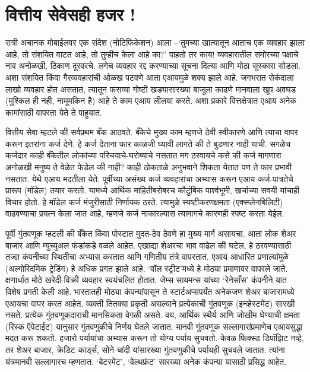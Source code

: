 \chapter{वित्तीय सेवेसही हजर !}

रात्री अचानक मोबाईलवर एक संदेश (नोटिफिकेशन) आला –`तुमच्या खात्यातून आताच एक व्यवहार झाला आहे, तो संशयित वाटत आहे, तो तुम्हीच केला आहे का?' पाहतो तर काय! व्यवहारातील समोरच्या पक्षाचे नाव अनोळखी, ठिकाण दूरवरचे. लगेच व्यवहार रद्द करण्याच्या सूचना दिल्या आणि मोठा सुस्कारा सोडला. अशा संशयित किंवा गैरव्यवहारांची ओळख पटवणे आता एआयमुळे शक्य झाले आहे. जगभरात सेकंदाला लाखो व्यवहार होत असतात, त्यातून फसव्या गोष्टी खड्यासारख्या बाजूला काढणे मानवाला खूप अवघड (मुश्किल ही नही, नामूमकिन है) आहे ते काम एआय लीलया करते. अशा प्रकारे वित्तक्षेत्रात एआय अनेक कामांसाठी वापरता येते ते पाहुयात.

वित्तीय सेवा म्हटले की सर्वप्रथम बँक आठवते. बँकेचे मुख्य काम म्हणजे ठेवी स्वीकारणे आणि त्याचा वापर करून इतरांना कर्ज देणे. हे कर्ज देताना फार काळजी घ्यावी लागते की ते बुडणार नाही याची. सगळेच कर्जदार काही बँकेतील लोकांच्या परिचयाचे-घरोब्याचे नसतात मग ठरवायचे कसे की कर्ज मागणारा अनोळखी मनुष्य ते वेळेत फेडेल की नाही? काही ठोकताळे अनुभवाने शिकता येतात पण ते फार प्रभावी नसतात. येथे एआय मदतीला येते. पूर्वीच्या असंख्य कर्ज व्यवहारांचा अभ्यास करून एआय कर्ज-पात्रतेचे प्रारूप (मॉडेल) तयार करतो. यामध्ये आर्थिक माहितीबरोबरच कौटुंबिक पार्श्वभूमी, खर्चाच्या सवयी यांचाही विचार होतो. हे मॉडेल कर्ज मंजुरीसाठी निर्णायक ठरते. त्यामुळे स्पष्टीकरणक्षमता (एक्स्प्लेनबिलिटी) वाढवण्याचा प्रयत्न केला जात आहे, म्हणजे कर्ज नाकारल्यास त्यामागचे कारणही स्पष्ट करता येईल.

पूर्वी गुंतवणूक म्हटली की बँकेत किंवा पोस्टात मुदत-ठेव ठेवणे हा मुख्य मार्ग असायचा. आता लोक शेअर बाजार आणि म्युच्युअल फंडांकडे वळले आहेत. एखाद्या शेअरचा भाव वाढेल की घटेल, हे ठरवण्यासाठी तज्ज्ञ कंपनीच्या स्थितीचा अभ्यास करतात आणि गणितीय तंत्रे वापरतात. एआय आधारित प्रणाल्यांमुळे (अल्गोरिदमिक ट्रेडिंग) हे अधिक प्रगत झाले आहे. `वॉल स्ट्रीट'मध्ये हे मोठ्या प्रमाणावर वापरले जाते. क्षणार्धात मोठे खरेदी-विक्री व्यवहार स्वयंचलित होतात. जेम्स सायमन्स यांच्या `रेनेसाँस' कंपनीने यात विशेष प्रगती केली आहे. भारतातही मोठ्या कंपन्यांपासून ते स्टार्टअप्सपर्यंत अनेकजण शेअर बाजारामध्ये एआयचा वापर करत आहेत. व्यक्ती तितक्या प्रकृती असल्याने प्रत्येकाची गुंतवणूक (इन्व्हेस्टमेंट) सारखी नसते. प्रत्येक गुंतवणूकदाराची मानसिकता वेगळी असते. वय, आर्थिक स्थैर्य आणि जोखीम घेण्याची क्षमता (रिस्क ऍपेटाईट) यानुसार गुंतवणुकीचे निर्णय घेतले जातात. मानवी गुंतवणूक सल्लागारांप्रमाणेच एआयसुद्धा मदत करू शकतो. हजारो पर्यायांचा अभ्यास करून तो योग्य पर्याय सुचवतो. केवळ फिक्स्ड डिपॉझिट नव्हे, तर शेअर बाजार, क्रेडिट कार्ड्स, सोने-चांदी यांसारख्या गुंतवणुकीचे पर्यायही सुचवले जातात. त्यांना यंत्रमानवी सल्लागारच म्हणतात. `बेटरमेंट', `वेल्थफ्रंट' सारख्या अनेक कंपन्या यासाठी प्रसिद्ध आहेत.

